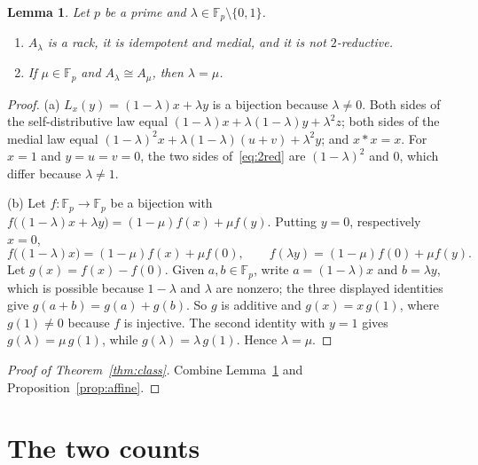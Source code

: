 \documentclass[11pt]{article}
\newtheorem{lemma}{Lemma}
\theoremstyle{definition}
\theoremstyle{remark}
\newcommand{\F}{\mathbb F}
\begin{document}
\begin{lemma}\label{lem:models}
Let $p$ be a prime and $\lambda\in\F_p\setminus\{0,1\}$.
\begin{enumerate}
\item[(a)] $A_\lambda$ is a rack, it is idempotent and medial, and it is not
$2$-reductive.
\item[(b)] If $\mu\in\F_p$ and $A_\lambda\cong A_\mu$, then $\lambda=\mu$.
\end{enumerate}
\end{lemma}

\begin{proof}
(a) $L_x(y)=(1-\lambda)x+\lambda y$ is a bijection because $\lambda\ne0$. Both
sides of the self-distributive law equal
$(1-\lambda)x+\lambda(1-\lambda)y+\lambda^2z$; both sides of the medial law
equal $(1-\lambda)^2x+\lambda(1-\lambda)(u+v)+\lambda^2y$; and
$x*x=x$. For $x=1$ and $y=u=v=0$, the two sides of~\eqref{eq:2red} are
$(1-\lambda)^2$ and $0$, which differ because $\lambda\ne1$.

(b) Let $f\colon\F_p\to\F_p$ be a bijection with
$f\bigl((1-\lambda)x+\lambda y\bigr)=(1-\mu)f(x)+\mu f(y)$. Putting $y=0$,
respectively $x=0$,
\[
f\bigl((1-\lambda)x\bigr)=(1-\mu)f(x)+\mu f(0),\qquad
f(\lambda y)=(1-\mu)f(0)+\mu f(y).
\]
Let $g(x)=f(x)-f(0)$. Given $a,b\in\F_p$, write $a=(1-\lambda)x$ and
$b=\lambda y$, which is possible because $1-\lambda$ and $\lambda$ are
nonzero; the three displayed identities give $g(a+b)=g(a)+g(b)$. So $g$ is
additive and $g(x)=x\,g(1)$, where $g(1)\ne0$ because $f$ is injective. The
second identity with $y=1$ gives $g(\lambda)=\mu\,g(1)$, while
$g(\lambda)=\lambda\,g(1)$. Hence $\lambda=\mu$.
\end{proof}

\begin{proof}[Proof of Theorem~\ref{thm:class}]
Combine Lemma~\ref{lem:models} and Proposition~\ref{prop:affine}.
\end{proof}

\section{The two counts}\label{sec:count}
\end{document}
